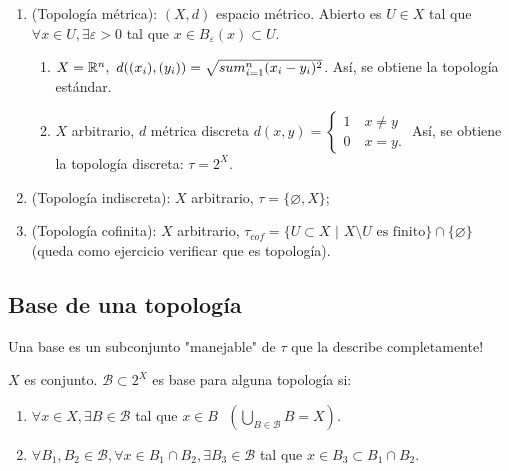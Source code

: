 \begin{eg} \text{}
	\begin{enumerate}
		\item (Topología métrica): $(X,d)$ espacio métrico. Abierto es $U \in X$ tal que $\forall x \in U, \exists \varepsilon > 0$ tal que $x \in B_{\varepsilon} (x) \subset U$.
		\begin{enumerate}
			\item $X = \mathbb{R}^n, \text{ } d((x_i),(y_i)) = \sqrt{ \\sum_{i=1}^{n} (x_i - y_i)^2 }$. Así, se obtiene la topología estándar.

			\item $X$ arbitrario, $d$ métrica discreta $d(x,y) = \begin{cases}
				1 \quad x \neq y \\
				0 \quad x = y.
			\end{cases}$ Así, se obtiene la topología discreta: $\tau = 2^X$.
		\end{enumerate}

		\item (Topología indiscreta): $X$ arbitrario, $\tau = \{ \varnothing , X \}$;

		\item (Topología cofinita): $X$ arbitrario, $\tau_{cof} = \{ U \subset X \text{ | } X \setminus U \text{ es finito} \} \cap \{ \varnothing \}$ (queda como ejercicio verificar que es topología).
	\end{enumerate}
\end{eg}

\subsection{Base de una topología}

Una base es un subconjunto "manejable" de $\tau$ que la describe completamente!

\begin{definition}[base]
	$X$ es conjunto. $\mathcal{B} \subset 2^X$ es base para alguna topología si:
	\begin{enumerate}
		\item $\forall x \in X, \exists B \in \mathcal{B}$ tal que $x \in B \text{ } \left( \bigcup_{B \in \mathcal{B}} B = X \right)$.

		\item $\forall B_1, B_2 \in \mathcal{B}, \forall x \in B_1 \cap B_2, \exists B_3 \in \mathcal{B}$ tal que $x \in B_3 \subset B_1 \cap B_2$.
	\end{enumerate}
\end{definition}

